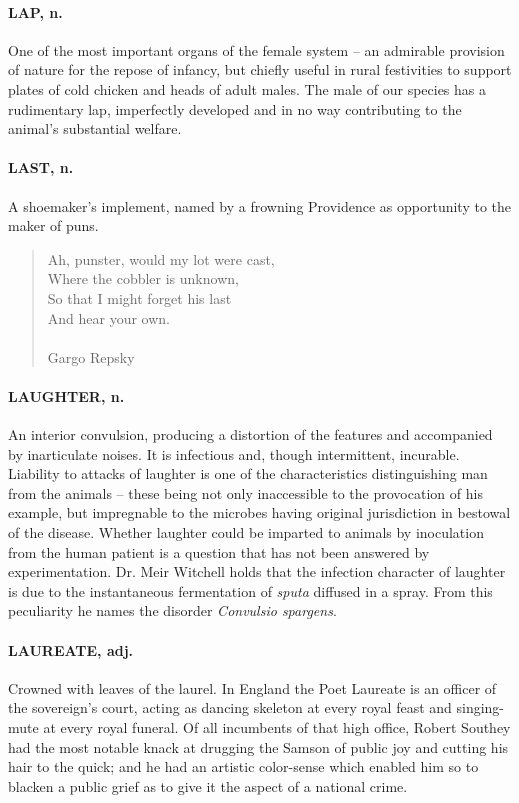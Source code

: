 \documentclass[11pt]{article}
\begin{document}
\paragraph{LAP, n.}  One of the most important organs of the female system -- an
admirable provision of nature for the repose of infancy, but chiefly
useful in rural festivities to support plates of cold chicken and
heads of adult males.  The male of our species has a rudimentary lap,
imperfectly developed and in no way contributing to the animal's
substantial welfare.

\paragraph{LAST, n.}  A shoemaker's implement, named by a frowning Providence as
opportunity to the maker of puns.

\begin{quote}   Ah, punster, would my lot were cast, \\
      Where the cobbler is unknown, \\
  So that I might forget his last \\
      And hear your own. \\
 \\
Gargo Repsky \end{quote}


\paragraph{LAUGHTER, n.}  An interior convulsion, producing a distortion of the
features and accompanied by inarticulate noises.  It is infectious
and, though intermittent, incurable.  Liability to attacks of laughter
is one of the characteristics distinguishing man from the animals --
these being not only inaccessible to the provocation of his example,
but impregnable to the microbes having original jurisdiction in
bestowal of the disease.  Whether laughter could be imparted to
animals by inoculation from the human patient is a question that has
not been answered by experimentation.  Dr. Meir Witchell holds that
the infection character of laughter is due to the instantaneous
fermentation of {\em sputa} diffused in a spray.  From this peculiarity he
names the disorder {\em Convulsio spargens}.

\paragraph{LAUREATE, adj.}  Crowned with leaves of the laurel.  In England the
Poet Laureate is an officer of the sovereign's court, acting as
dancing skeleton at every royal feast and singing-mute at every royal
funeral.  Of all incumbents of that high office, Robert Southey had
the most notable knack at drugging the Samson of public joy and
cutting his hair to the quick; and he had an artistic color-sense
which enabled him so to blacken a public grief as to give it the
aspect of a national crime.
\end{document}
